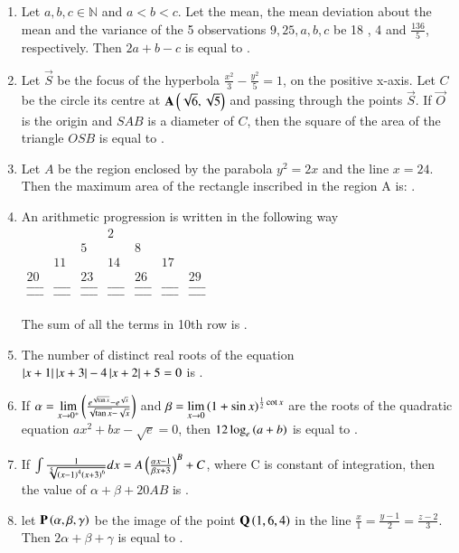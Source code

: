 \documentclass[journal]{IEEEtran}
\begin{document}
\begin{enumerate}[start=16]
\item %
Let $a,b,c \in \mathbb{N}$ and $a<b<c$. Let the mean, the mean deviation about the mean and the variance of the 5 observations $9,25,a,b,c$ be 18 , 4 and $\frac{136}{5}$, respectively. Then $2a+b-c$ is equal to \underline{\hspace{1cm}}.
\item %
Let $\vec{S}$ be the focus of the hyperbola $\frac{x^2}{3} - \frac{y^2}{5} = 1$, on the positive x-axis. Let $C$ be the circle its centre at $\mathbf{A\left(\sqrt{6},\sqrt{5}\right)}$ and passing through the points $\vec{S}$. If $\vec{O}$ is the origin and $SAB$ is a diameter of $C$, then the square of the area of the triangle $OSB$ is equal to \underline{\hspace{1cm}}. 
\item %
Let $A$ be the region enclosed by the parabola $y^2 = 2x$ and the line $x=24$. Then the maximum area of the rectangle inscribed in the region A is: \underline{\hspace{1cm}}.
\item %
An arithmetic progression is written in the following way 
$
\begin{array}{ccccccc}
& & & 2\\
& & 5 & & 8 & & \\
& 11 &  & 14 & & 17 & \\
20 & & 23 & & 26 & & 29  \\
\_ \_ \_ \_ & \_ \_ \_ \_ & \_ \_ \_ \_ & \_ \_ \_ \_ & \_ \_ \_ \_ & \_ \_ \_ \_ & \_ \_ \_ \_ \\
\_ \_ \_ \_ & \_ \_ \_ \_ & \_ \_ \_ \_ & \_ \_ \_ \_ & \_ \_ \_ \_ & \_ \_ \_ \_ & \_ \_ \_ \_ 
\end{array}
$\\
\\
The sum of all the terms in 10th row is \underline{\hspace{1cm}}.
\item %
The number of distinct real roots of the equation $\left\vert x + 1\right\vert \left\vert x + 3\right\vert - 4\left\vert x + 2\right\vert + 5 = 0$ is \underline{\hspace{1cm}}.
\item %
If $\alpha = \lim\limits_{x \to 0^+} \left(\frac{e^{\sqrt{\tan{x}}} - e^{\sqrt{x}}}{\sqrt{\tan{x}}-\sqrt{x}}\right)$ and $\beta = \lim\limits_{x \to 0}\left(1+\sin{x}\right)^{\frac{1}{2}\cot{x}}$ are the roots of the quadratic equation $ax^2+bx-\sqrt{e} = 0$, then $12 \log_e \left(a+b\right)$ is equal to \underline{\hspace{1cm}}. 
\item %
If $  \int \frac{1}{\sqrt[5]{\left(x-1\right)^4\left(x+3\right)^6}} dx = A\left(\frac{\alpha x -1}{\beta x + 3}\right)^B + C$, where C is constant of integration, then the value of $\alpha + \beta +20AB$ is \underline{\hspace{1cm}}.
\item %
let $\mathbf{P}\left(\alpha , \beta , \gamma \right)$ be the image of the point $\mathbf{Q}\left(1 , 6, 4\right)$ in the line $\frac{x}{1} = \frac{y-1}{2} = \frac{z-2}{3}$. Then $2\alpha +\beta +\gamma$ is equal to \underline{\hspace{1cm}}.
\end{enumerate}
\end{document}
